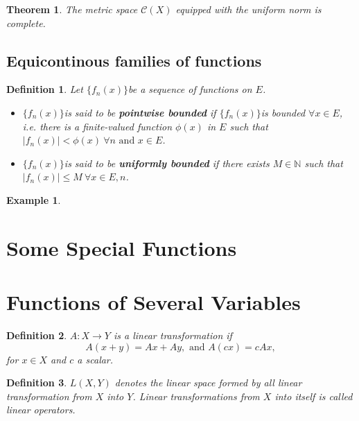 \documentclass[12pt]{article}
\newtheorem{thm}{Theorem}[section]
\newtheorem{defn}{Definition}[section]
\newtheorem{ex}{Example}[section]
\newcommand{\fseq}{$\{f_n(x)\}$}
\newcommand{\N}{\mathbb{N}}
\begin{document}
\begin{thm}
	The metric space $\mathcal{C}(X)$ equipped with the uniform norm is complete.
\end{thm}


\subsection{Equicontinous families of functions}
\begin{defn}
	Let \fseq be a sequence of functions on $E$.
	\begin{itemize}
		\item \fseq is said to be \textbf{pointwise bounded} if \fseq is bounded $\forall x \in E$, i.e. there is  a finite-valued function $\phi(x)$ in $E$ such that $|f_n(x)| < \phi(x) ~\forall n \text{ and } x \in E$.
		\item \fseq is said to be \textbf{uniformly bounded} if there exists $M \in \N$ such that $|f_n(x)| \leq M ~\forall x\in E, n$.
	\end{itemize}
\end{defn}
\begin{ex}
	
\end{ex}

\section{Some Special Functions}



\section{Functions of Several Variables}
\begin{defn}
	$A: X \rightarrow Y$ is  a linear transformation if \[A(x + y) = Ax + Ay, \text{ and  } A(cx)=cAx,\] for $x \in X$ and $c$ a scalar.
\end{defn}

\begin{defn}
	$L(X, Y)$ denotes the linear space formed by all linear transformation from $X$ into $Y$. Linear transformations from $X$ into itself is called linear operators.
\end{defn}
\end{document}

